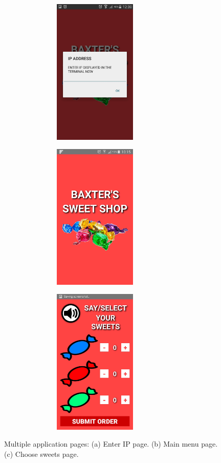 \begin{figure}[H]
    \captionsetup[subfigure]{justification=centering}
    \begin{subfigure}[H]{0.325\textwidth}   
        \centering 
        \caption{}
        \includegraphics[width=0.8\textwidth, height=7cm]{ipbootpage.png}
        \label{fig:ipEntry}
    \end{subfigure}
    \begin{subfigure}[H]{0.325\textwidth}   
        \centering 
        \caption{}
        \includegraphics[width=0.8\textwidth, height=7cm]{apphomepage.png}
        \label{fig:appMenu}
    \end{subfigure}
    \begin{subfigure}[H]{0.325\textwidth}   
        \centering 
        \caption{}
        \includegraphics[width=0.8\textwidth, height=7cm]{sweetchoicepage.png}
        \label{fig:appCommand}
    \end{subfigure}
    \caption{Multiple application pages: (a) Enter IP page. (b) Main menu page. (c) Choose sweets page.}
\end{figure}
